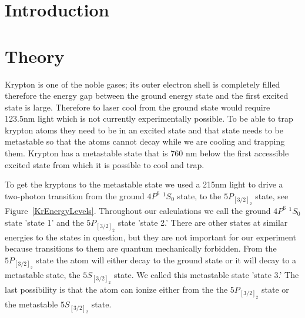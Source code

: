 \documentclass[prb,preprint]{revtex4-1}
\begin{document}
\title{}


\author{Danika Luntz-Martin}

\author{William Williams}

\date{\today}

\begin{abstract}


\end{abstract}


\maketitle 


\section{Introduction} 


\section{Theory}

Krypton is one of the noble gases; its outer electron shell is completely filled therefore the energy gap between the ground energy state and the first excited state is large. Therefore to laser cool from the ground state would require 123.5nm light which is not currently experimentally possible. To be able to trap krypton atoms they need to be in an excited state and that state needs to be metastable so that the atoms cannot decay while we are cooling and trapping them. Krypton has a metastable state that is 760 nm below the first accessible excited state from which it is possible to cool and trap.

To get the kryptons to the metastable state we used a 215nm light to drive a two-photon transition from the ground $4P^6$ $^1S_0$ state, to the $5P_{[3/2]_2}$ state, see Figure~\ref{KrEnergyLevels}. Throughout our calculations we call the ground $4P^6$ $^1S_0$ state 'state 1' and the $5P_{[3/2]_2}$ state 'state 2.' There are other states at similar energies to the states in question, but they are not important for our experiment because transitions to them are quantum mechanically forbidden. From the $5P_{[3/2]_2}$ state the atom will either decay to the ground state or it will decay to a metastable state, the $5S_{[3/2]_2}$ state. We called this metastable state 'state 3.' The last possibility is that the atom can ionize either from the the $5P_{[3/2]_2}$ state or the metastable $5S_{[3/2]_2}$ state. 
\end{document}
